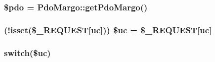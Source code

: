 \subsubsection[{\$pdo}]{\setlength{\rightskip}{0pt plus 5cm}\$pdo = {\bf Pdo\+Margo\+::get\+Pdo\+Margo}()}\label{index_8php_a5766efd703cef0e00bfc06b3f3acbe0e}
\hypertarget{index_8php_a55340ffe7841a0010c930e0bbe7b6a92}{}
\subsubsection[{\$uc}]{ (!isset(\$\+\_\+\+R\+E\+Q\+U\+E\+S\+T\mbox{[}\textquotesingle{}uc\textquotesingle{}\mbox{]})) \$uc = \$\+\_\+\+R\+E\+Q\+U\+E\+S\+T\mbox{[}\textquotesingle{}uc\textquotesingle{}\mbox{]}}\label{index_8php_a55340ffe7841a0010c930e0bbe7b6a92}
\hypertarget{index_8php_a6160ae6d9a60bbcc19780fa9bc2c9b41}{}
\subsubsection[{switch}]{\setlength{\rightskip}{0pt plus 5cm}switch(\$uc)}\label{index_8php_a6160ae6d9a60bbcc19780fa9bc2c9b41}
